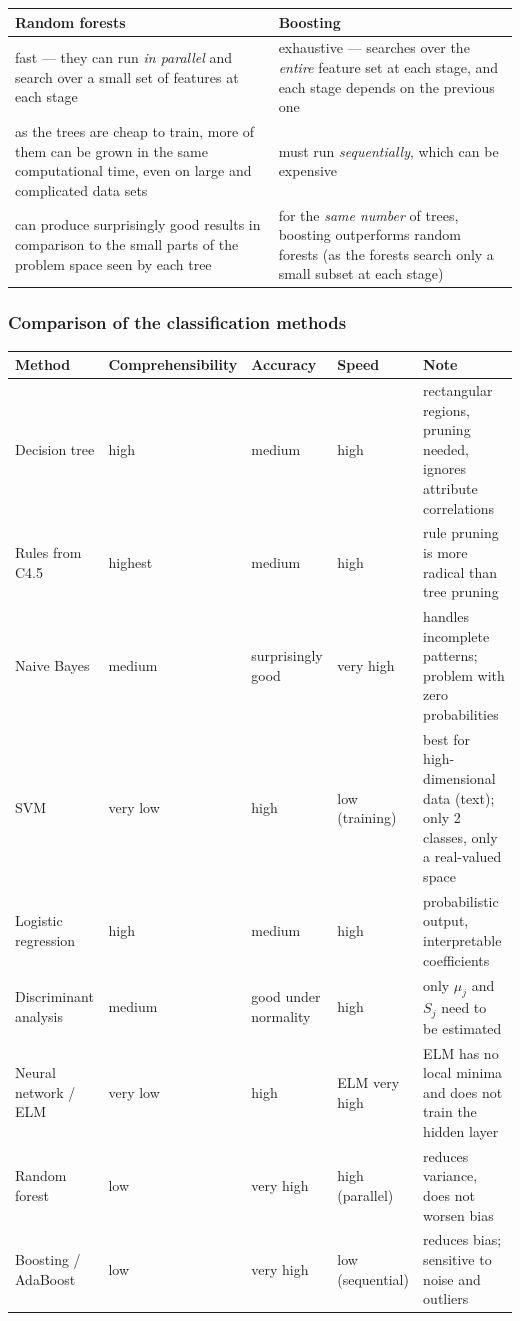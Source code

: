 \documentclass[11pt,a4paper]{article}
\theoremstyle{definition}
\begin{document}
\begin{center}
\small
\begin{tabular}{@{}p{7.6cm}p{8.0cm}@{}}
\toprule
\textbf{Random forests} & \textbf{Boosting} \\
\midrule
fast --- they can run \emph{in parallel} and search over a small set of features at each stage &
  exhaustive --- searches over the \emph{entire} feature set at each stage, and each stage depends
  on the previous one \\
as the trees are cheap to train, more of them can be grown in the same computational time, even on
  large and complicated data sets & must run \emph{sequentially}, which can be expensive \\
can produce surprisingly good results in comparison to the small parts of the problem space seen
  by each tree & for the \emph{same number} of trees, boosting outperforms random forests (as the
  forests search only a small subset at each stage) \\
\bottomrule
\end{tabular}
\end{center}

\subsubsection{Comparison of the classification methods}

\begin{center}
\small
\begin{tabular}{@{}p{2.9cm}p{2.3cm}p{2.2cm}p{2.3cm}p{4.6cm}@{}}
\toprule
\textbf{Method} & \textbf{Comprehen\-sibility} & \textbf{Accuracy} & \textbf{Speed}
  & \textbf{Note} \\
\midrule
Decision tree & high & medium & high & rectangular regions, pruning needed, ignores attribute
  correlations \\
Rules from C4.5 & highest & medium & high & rule pruning is more radical than tree pruning \\
Naive Bayes & medium & surprisingly good & very high & handles incomplete patterns; problem with
  zero probabilities \\
SVM & very low & high & low (training) & best for high-dimensional data (text); only 2 classes,
  only a real-valued space \\
Logistic regression & high & medium & high & probabilistic output, interpretable coefficients \\
Discriminant analysis & medium & good under normality & high & only $\mu_j$ and $S_j$ need to be
  estimated \\
Neural network / ELM & very low & high & ELM very high & ELM has no local minima and does not
  train the hidden layer \\
Random forest & low & very high & high (parallel) & reduces variance, does not worsen bias \\
Boosting / AdaBoost & low & very high & low (sequential) & reduces bias; sensitive to noise and
  outliers \\
\bottomrule
\end{tabular}
\end{center}
\end{document}
